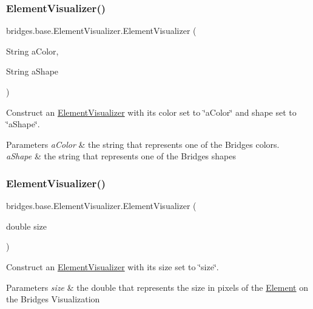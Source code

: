 \subsubsection{\texorpdfstring{Element\+Visualizer()}{ElementVisualizer()}\hspace{0.1cm}{\footnotesize\ttfamily [3/6]}}
{\footnotesize\ttfamily bridges.\+base.\+Element\+Visualizer.\+Element\+Visualizer (\begin{DoxyParamCaption}\item[{String}]{a\+Color,  }\item[{String}]{a\+Shape }\end{DoxyParamCaption})}

Construct an \hyperlink{classbridges_1_1base_1_1_element_visualizer}{Element\+Visualizer} with its color set to \char`\"{}a\+Color\char`\"{} and shape set to \char`\"{}a\+Shape\char`\"{}.


\begin{DoxyParams}{Parameters}
{\em a\+Color} & the string that represents one of the Bridges colors. \\
\hline
{\em a\+Shape} & the string that represents one of the Bridges shapes \\
\hline
\end{DoxyParams}
\hypertarget{classbridges_1_1base_1_1_element_visualizer_ab32f66b72ccf0a26c03ba44006da9ac6}{}\label{classbridges_1_1base_1_1_element_visualizer_ab32f66b72ccf0a26c03ba44006da9ac6} 
\subsubsection{\texorpdfstring{Element\+Visualizer()}{ElementVisualizer()}\hspace{0.1cm}{\footnotesize\ttfamily [4/6]}}
{\footnotesize\ttfamily bridges.\+base.\+Element\+Visualizer.\+Element\+Visualizer (\begin{DoxyParamCaption}\item[{double}]{size }\end{DoxyParamCaption})}

Construct an \hyperlink{classbridges_1_1base_1_1_element_visualizer}{Element\+Visualizer} with its size set to \char`\"{}size\char`\"{}.


\begin{DoxyParams}{Parameters}
{\em size} & the double that represents the size in pixels of the \hyperlink{classbridges_1_1base_1_1_element}{Element} on the Bridges Visualization \\
\hline
\end{DoxyParams}
\hypertarget{classbridges_1_1base_1_1_element_visualizer_a9bf06ca1b6c215e079ab33ccd99633e8}{}\label{classbridges_1_1base_1_1_element_visualizer_a9bf06ca1b6c215e079ab33ccd99633e8} 
